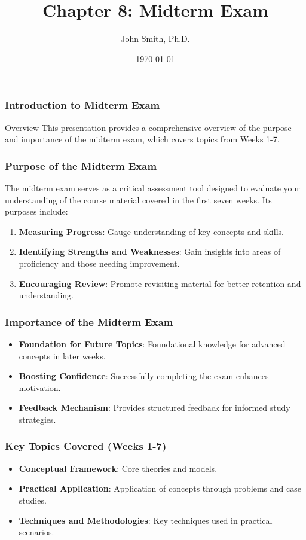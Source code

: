 \documentclass[aspectratio=169]{beamer}
\title[Chapter 8: Midterm Exam]{Chapter 8: Midterm Exam}
\author[J. Smith]{John Smith, Ph.D.}
\institute[University Name]{
  Department of Computer Science\\
  University Name\\
  \vspace{0.3cm}
  Email: email@university.edu\\
  Website: www.university.edu
}
\date{\today}
\begin{document}
\frame{\titlepage}

\begin{frame}[fragile]
    \frametitle{Introduction to Midterm Exam}
    \begin{block}{Overview}
        This presentation provides a comprehensive overview of the purpose and importance of the midterm exam, which covers topics from Weeks 1-7.
    \end{block}
\end{frame}

\begin{frame}[fragile]
    \frametitle{Purpose of the Midterm Exam}
    The midterm exam serves as a critical assessment tool designed to evaluate your understanding of the course material covered in the first seven weeks. Its purposes include:
    \begin{enumerate}
        \item \textbf{Measuring Progress}: Gauge understanding of key concepts and skills.
        \item \textbf{Identifying Strengths and Weaknesses}: Gain insights into areas of proficiency and those needing improvement.
        \item \textbf{Encouraging Review}: Promote revisiting material for better retention and understanding.
    \end{enumerate}
\end{frame}

\begin{frame}[fragile]
    \frametitle{Importance of the Midterm Exam}
    \begin{itemize}
        \item \textbf{Foundation for Future Topics}: Foundational knowledge for advanced concepts in later weeks.
        \item \textbf{Boosting Confidence}: Successfully completing the exam enhances motivation.
        \item \textbf{Feedback Mechanism}: Provides structured feedback for informed study strategies.
    \end{itemize}
\end{frame}

\begin{frame}[fragile]
    \frametitle{Key Topics Covered (Weeks 1-7)}
    \begin{itemize}
        \item \textbf{Conceptual Framework}: Core theories and models.
        \item \textbf{Practical Application}: Application of concepts through problems and case studies.
        \item \textbf{Techniques and Methodologies}: Key techniques used in practical scenarios.
    \end{itemize}
\end{frame}
\end{document}
